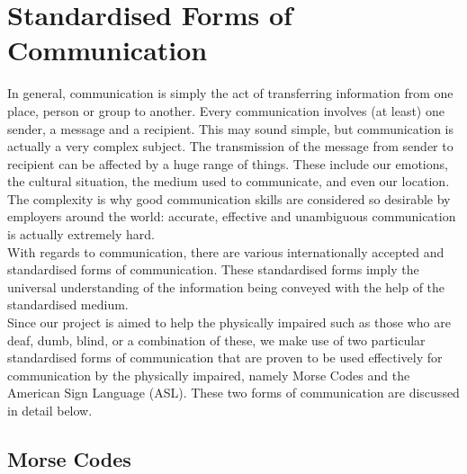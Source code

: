 \documentclass[14pt]{report}
\begin{document}
				\section{Standardised Forms of Communication}
				In general, communication is simply the act of transferring information from one place, person or group to another. Every communication involves (at least) one sender, a message and a recipient. This may sound simple, but communication is actually a very complex subject. The transmission of the message from sender to recipient can be affected by a huge range of things. These include our emotions, the cultural situation, the medium used to communicate, and even our location. The complexity is why good communication skills are considered so desirable by employers around the world: accurate, effective and unambiguous communication is actually extremely hard.\\

				With regards to communication, there are various internationally accepted and standardised forms of communication. These standardised forms imply the universal understanding of the information being conveyed with the help of the standardised medium.\\

				Since our project is aimed to help the physically impaired such as those who are deaf, dumb, blind, or a combination of these, we make use of two particular standardised forms of communication that are proven to be used effectively for communication by the physically impaired, namely Morse Codes and the American Sign Language (ASL). These two forms of communication are discussed in detail below. 
			\subsection{Morse Codes}
\end{document}
